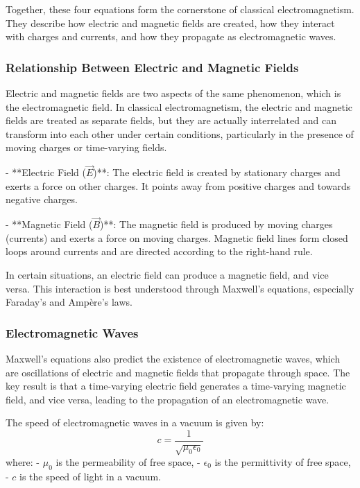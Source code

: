 \documentclass{article}
\begin{document}
Together, these four equations form the cornerstone of classical electromagnetism. They describe how electric and magnetic fields are created, how they interact with charges and currents, and how they propagate as electromagnetic waves.

\subsubsection*{Relationship Between Electric and Magnetic Fields}

Electric and magnetic fields are two aspects of the same phenomenon, which is the electromagnetic field. In classical electromagnetism, the electric and magnetic fields are treated as separate fields, but they are actually interrelated and can transform into each other under certain conditions, particularly in the presence of moving charges or time-varying fields.

- **Electric Field (\( \vec{E} \))**: The electric field is created by stationary charges and exerts a force on other charges. It points away from positive charges and towards negative charges.
  
- **Magnetic Field (\( \vec{B} \))**: The magnetic field is produced by moving charges (currents) and exerts a force on moving charges. Magnetic field lines form closed loops around currents and are directed according to the right-hand rule.

In certain situations, an electric field can produce a magnetic field, and vice versa. This interaction is best understood through Maxwell's equations, especially Faraday’s and Ampère’s laws.

\subsubsection*{Electromagnetic Waves}

Maxwell's equations also predict the existence of electromagnetic waves, which are oscillations of electric and magnetic fields that propagate through space. The key result is that a time-varying electric field generates a time-varying magnetic field, and vice versa, leading to the propagation of an electromagnetic wave.

The speed of electromagnetic waves in a vacuum is given by:
\[
c = \frac{1}{\sqrt{\mu_0 \epsilon_0}}
\]
where:
- \( \mu_0 \) is the permeability of free space,
- \( \epsilon_0 \) is the permittivity of free space,
- \( c \) is the speed of light in a vacuum.
\end{document}
